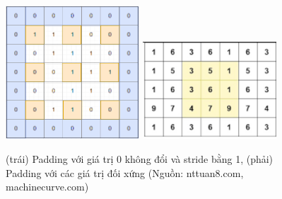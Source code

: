 {    \begin{figure}[H]
    \centering
    \includegraphics[width=5cm] {images/stride_pad.png}
    \hspace{1.5cm}
    \includegraphics[width=5cm] {images/padding_reflection.png}
    \caption{(trái) Padding với giá trị 0 không đổi và stride bằng 1, (phải) Padding với các giá trị đối xứng (Nguồn: nttuan8.com, machinecurve.com)}
    \label{fig:stride_pad}
    \end{figure}
    
}
